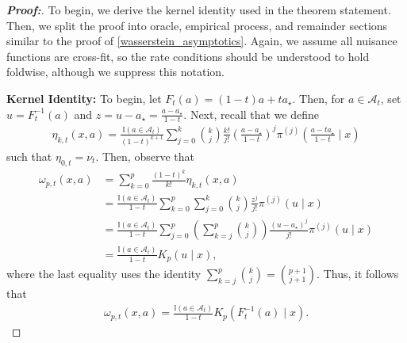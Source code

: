 \documentclass[11pt,twoside]{article}
\theoremstyle{definition}
\theoremstyle{remark}
\begin{document}
\begin{proof}[\textbf{Proof:}] 
     To begin, we derive the kernel identity used in the theorem statement. Then, we split the proof into oracle, empirical process, and remainder sections similar to the proof of \cref{wasserstein_asymptotics}. Again, we assume all nuisance functions are cross-fit, so the rate conditions should be understood to hold foldwise, although we suppress this notation. \medskip

     \textbf{Kernel Identity:} To begin, let $F_t(a) = (1 - t)a + t a_\star$. Then, for $a \in \mathcal{A}_t$, set $u=F_t^{-1}(a)$ and $z=u-a_\star=\frac{a-a_\star}{1-t}$. Next, recall that we define
     \begin{align*}
           \eta_{k,t}(x,a) = \frac{\mathbb{I}(a\in\mathcal{A}_t)}{(1-t)^{k+1}} \sum_{j=0}^{k} \binom{k}{j} \frac{k!}{j!} \left( \frac{a-a_\star}{1-t}\right)^j \pi^{(j)}\left(\frac{a-ta_\star}{1-t}\mid x\right)
     \end{align*}
     such that $\eta_{0, t} = \nu_t$. Then, observe that
     \begin{align*}
     \omega_{p,t}(x,a) &= \sum_{k=0}^{p}\frac{(1-t)^k}{k!}\eta_{k,t}(x,a)\\ 
     &= \frac{\mathbb{I}(a\in\mathcal{A}_t)}{1-t} \sum_{k=0}^{p}\sum_{j=0}^{k} \binom{k}{j}\frac{z^j}{j!}\pi^{(j)}(u\mid x)\\
     &= \frac{\mathbb{I}(a\in\mathcal{A}_t)}{1-t} \sum_{j=0}^{p} \left(\sum_{k=j}^{p}\binom{k}{j}\right) \frac{(u-a_\star)^j}{j!}\pi^{(j)}(u\mid x)\\
     &= \frac{\mathbb{I}(a\in\mathcal{A}_t)}{1-t}K_p(u\mid x),
\end{align*}
where the last equality uses the identity $ \sum_{k=j}^{p}\binom{k}{j} = \binom{p+1}{j+1}$. 
Thus, it follows that
\begin{align} \label{omega_kernel_def}
    \omega_{p,t}(x,a) = \frac{\mathbb{I}(a\in\mathcal{A}_t)}{1-t} K_p\!\left(F_t^{-1}(a)\mid x\right).
\end{align}


\end{proof}
\end{document}
